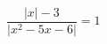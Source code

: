 \begin{ex}[type=equation]
	\begin{condition}
		$\dfrac{\big|x\big| - 3}{\big|x^2 - 5x -6\big|} = 1$
	\end{condition}
\end{ex}